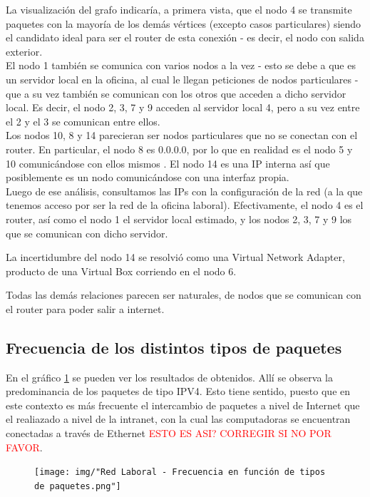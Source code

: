 La visualización del grafo indicaría, a primera vista, que el nodo 4 se transmite paquetes con la mayoría de los demás vértices (excepto casos particulares) siendo el candidato ideal para ser el router de esta conexión - es decir, el nodo con salida exterior.\\

El nodo 1 también se comunica con varios nodos a la vez - esto se debe a que es un servidor local en la oficina, al cual le llegan peticiones de nodos particulares - que a su vez también se comunican con los otros que acceden a dicho servidor local. Es decir, el nodo 2, 3, 7 y 9 acceden al servidor local 4, pero a su vez entre el 2 y el 3 se comunican entre ellos.\\

Los nodos 10, 8 y 14 parecieran ser nodos particulares que no se conectan con el router. En particular, el nodo 8 es 0.0.0.0, por lo que en realidad es el nodo 5 y 10 comunicándose con ellos mismos . El nodo 14 es una IP interna así que posiblemente es un nodo comunicándose con una interfaz propia.\\

Luego de ese análisis, consultamos las IPs con la configuración de la red (a la que tenemos acceso por ser la red de la oficina laboral). Efectivamente, el nodo 4 es el router, así como el nodo 1 el servidor local estimado, y los nodos 2, 3, 7 y 9 los que se comunican con dicho servidor.

La incertidumbre del nodo 14 se resolvió como una Virtual Network Adapter, producto de una Virtual Box corriendo en el nodo 6.

Todas las demás relaciones parecen ser naturales, de nodos que se comunican con el router para poder salir a internet.

\subsection{Frecuencia de los distintos tipos de paquetes}

En el gráfico \ref{laboral:paquetes} se pueden ver los resultados de obtenidos. Allí se observa la predominancia de los paquetes de tipo IPV4. Esto tiene sentido, puesto que en este contexto es más frecuente el intercambio de paquetes a nivel de Internet que el realiazado a nivel de la intranet, con la cual las computadoras se encuentran conectadas a través de Ethernet \textcolor{red}{ESTO ES ASI? CORREGIR SI NO POR FAVOR}.

\begin{figure}[h!]
    \centering                                                       
    \texttt{[image: img/"Red Laboral - Frecuencia en función de tipos de paquetes.png"]}
    \caption{}
    \label{laboral:paquetes}
\end{figure}


